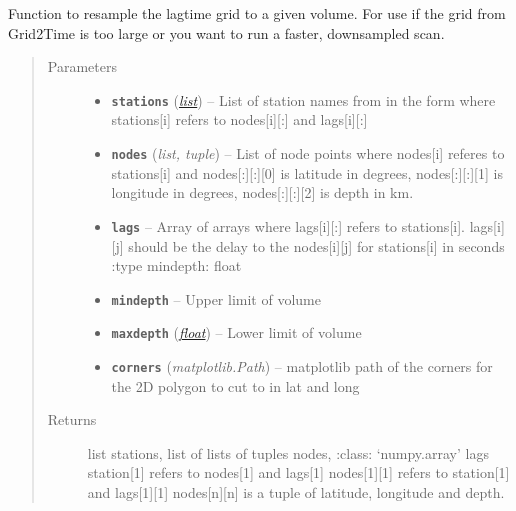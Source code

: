 \documentclass[a4paper,10pt,english]{sphinxmanual}
\begin{document}

\begin{fulllineitems}
\label{core:bright_lights._resample_grid}
Function to resample the lagtime grid to a given volume.  For use if the
grid from Grid2Time is too large or you want to run a faster, downsampled
scan.
\begin{quote}\begin{description}
\item[{Parameters}] \leavevmode\begin{itemize}
\item {} 
\textbf{\texttt{stations}} (\href{https://docs.python.org/library/functions.html\#list}{\emph{list}}) -- List of station names from in the form where stations{[}i{]}    refers to nodes{[}i{]}{[}:{]} and lags{[}i{]}{[}:{]}

\item {} 
\textbf{\texttt{nodes}} (\emph{list, tuple}) -- List of node points where nodes{[}i{]} referes to stations{[}i{]} and    nodes{[}:{]}{[}:{]}{[}0{]} is latitude in degrees, nodes{[}:{]}{[}:{]}{[}1{]} is longitude in    degrees, nodes{[}:{]}{[}:{]}{[}2{]} is depth in km.

\item {} 
\textbf{\texttt{lags}} -- Array of arrays where lags{[}i{]}{[}:{]} refers to stations{[}i{]}.    lags{[}i{]}{[}j{]} should be the delay to the nodes{[}i{]}{[}j{]} for stations{[}i{]} in seconds    :type mindepth: float

\item {} 
\textbf{\texttt{mindepth}} -- Upper limit of volume

\item {} 
\textbf{\texttt{maxdepth}} (\href{https://docs.python.org/library/functions.html\#float}{\emph{float}}) -- Lower limit of volume

\item {} 
\textbf{\texttt{corners}} (\emph{matplotlib.Path}) -- matplotlib path of the corners for the 2D polygon to cut to    in lat and long

\end{itemize}

\item[{Returns}] \leavevmode
list stations, list of lists of tuples nodes, :class:     `numpy.array' lags station{[}1{]} refers to nodes{[}1{]} and lags{[}1{]}    nodes{[}1{]}{[}1{]} refers to station{[}1{]} and lags{[}1{]}{[}1{]}    nodes{[}n{]}{[}n{]} is a tuple of latitude, longitude and depth.

\end{description}\end{quote}

\end{fulllineitems}
\end{document}
